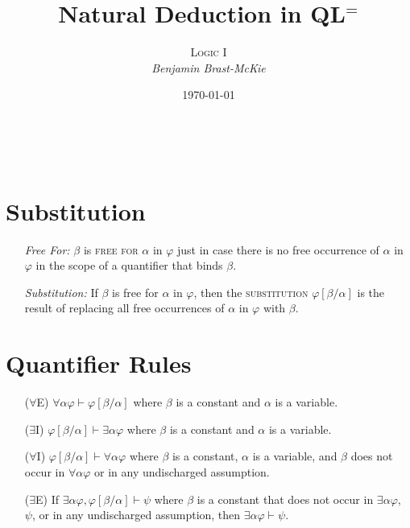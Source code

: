 \documentclass[a4paper, 11pt]{article} %
\title{\textbf{Natural Deduction in QL$^=$}} %
\author{\textsc{Logic I}\\ \em Benjamin Brast-McKie} %
\date{\today} %
\makeatletter
\newcommand{\unisub}[2]{[#1/#2]}
\renewcommand{\maketitle}{
\begin{flushright}
{\LARGE\@title}

\vspace{10pt}

{\@author}
\\ \@date
\end{flushright}

\vspace{0pt}

}
\makeatother
\begin{document}
\maketitle %

\thispagestyle{empty}



\section*{Substitution}

\begin{enumerate}
  \item[\it Free For:] $\beta$ is \textsc{free for} $\alpha$ in $\varphi$ just in case there is no free occurrence of $\alpha$ in $\varphi$ in the scope of a quantifier that binds $\beta$. 
  \item[\it Substitution:] If $\beta$ is free for $\alpha$ in $\varphi$, then the \textsc{substitution} $\varphi\unisub{\beta}{\alpha}$ is the result of replacing all free occurrences of $\alpha$ in $\varphi$ with $\beta$.
\end{enumerate}
   






\section*{Quantifier Rules}

\begin{enumerate}
  \item[($\forall$E)] $\forall\alpha\varphi \vdash \varphi\unisub{\beta}{\alpha}$ where $\beta$ is a constant and $\alpha$ is a variable. 
  \item[($\exists$I)] $\varphi\unisub{\beta}{\alpha} \vdash \exists\alpha\varphi$ where $\beta$ is a constant and $\alpha$ is a variable.
  \item[($\forall$I)] $\varphi\unisub{\beta}{\alpha} \vdash \forall\alpha\varphi$ where $\beta$ is a constant, $\alpha$ is a variable, and $\beta$ does not occur in $\forall\alpha\varphi$ or in any undischarged assumption.
  \item[($\exists$E)] If $\exists\alpha\varphi,\varphi\unisub{\beta}{\alpha} \vdash \psi$ where $\beta$ is a constant that does not occur in $\exists\alpha\varphi$, $\psi$, or in any undischarged assumption, then $\exists\alpha\varphi\vdash \psi$.
\end{enumerate}
\end{document}
